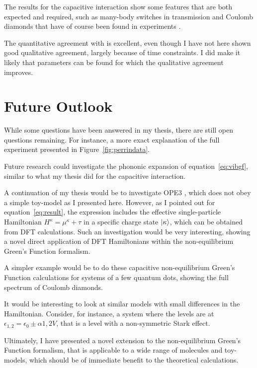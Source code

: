 The results for the capacitive interaction show some features that are both expected and required, such as many-body switches in transmission and Coulomb diamonds that have of course been found in experiments \cite{seldenthuis}. 

The quantitative agreement with \citet{perrinnano} is excellent, even though I have not here shown good qualitative agreement, largely because of time constraints. I did make it likely that parameters can be found for which the qualitative agreement improves.

\section{Future Outlook}
While some questions have been answered in my thesis, there are still open questions remaining. For instance, a more exact explanation of the full experiment presented in Figure~\ref{fig:perrindata}.

Future research could investigate the phononic expansion of equation~\ref{eq:vibgf}, similar to what my thesis did for the capacitive interaction.

A continuation of my thesis would be to investigate OPE3 \cite{frisenda}, which does not obey a simple toy-model as I presented here. However, as I pointed out for equation~\ref{eq:result}, the expression includes the effective single-particle Hamiltonian $H^\kappa = \mu^\kappa + \tau$ in a specific charge state $\ket{\kappa}$, which can be obtained from DFT calculations. Such an investigation would be very interesting, showing a novel direct application of DFT Hamiltonians within the non-equilibrium Green's Function formalism.

A simpler example would be to do these capacitive non-equilibrium Green's Function calculations for systems of a few quantum dots, showing the full spectrum of Coulomb diamonds.

It would be interesting to look at similar models with small differences in the Hamiltonian. Consider, for instance, a system where the levels are at $\epsilon_{1,2} = \epsilon_0 \pm \alpha{1,2} V$, that is a level with a non-symmetric Stark effect. 

Ultimately, I have presented a novel extension to the non-equilibrium Green's Function formalism, that is applicable to a wide range of molecules and toy-models, which should be of immediate benefit to the theoretical calculations.






\label{sec:outlook}
\clearpage
{}